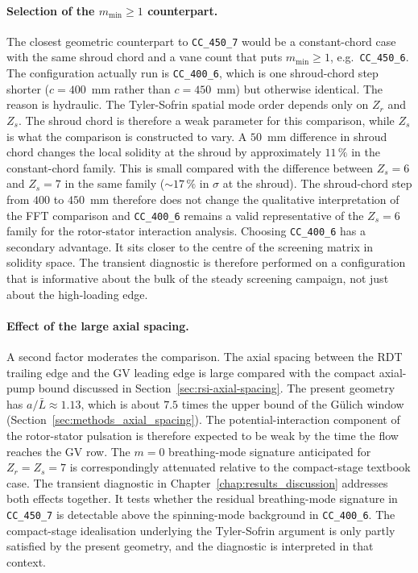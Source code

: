 \paragraph{Selection of the $m_{\min}\geq 1$ counterpart.}
The closest geometric counterpart to \texttt{CC\_450\_7} would be a constant-chord case with the same shroud chord and a vane count that puts $m_{\min}\geq 1$, e.g.\ \texttt{CC\_450\_6}. The configuration actually run is \texttt{CC\_400\_6}, which is one shroud-chord step shorter ($c=400$~mm rather than $c=450$~mm) but otherwise identical. The reason is hydraulic. The Tyler-Sofrin spatial mode order depends only on $Z_r$ and $Z_s$. The shroud chord is therefore a weak parameter for this comparison, while $Z_s$ is what the comparison is constructed to vary. A $50$~mm difference in shroud chord changes the local solidity at the shroud by approximately $11\,\%$ in the constant-chord family. This is small compared with the difference between $Z_s=6$ and $Z_s=7$ in the same family ($\sim 17\,\%$ in $\sigma$ at the shroud). The shroud-chord step from $400$ to $450$~mm therefore does not change the qualitative interpretation of the FFT comparison and \texttt{CC\_400\_6} remains a valid representative of the $Z_s=6$ family for the rotor-stator interaction analysis. Choosing \texttt{CC\_400\_6} has a secondary advantage. It sits closer to the centre of the screening matrix in solidity space. The transient diagnostic is therefore performed on a configuration that is informative about the bulk of the steady screening campaign, not just about the high-loading edge.

\paragraph{Effect of the large axial spacing.}
A second factor moderates the comparison. The axial spacing between the RDT trailing edge and the GV leading edge is large compared with the compact axial-pump bound discussed in Section~\ref{sec:rsi-axial-spacing}. The present geometry has $a/\bar{L} \approx 1.13$, which is about $7.5$ times the upper bound of the G\"ulich window (Section~\ref{sec:methods_axial_spacing}). The potential-interaction component of the rotor-stator pulsation is therefore expected to be weak by the time the flow reaches the GV row. The $m=0$ breathing-mode signature anticipated for $Z_r = Z_s = 7$ is correspondingly attenuated relative to the compact-stage textbook case. The transient diagnostic in Chapter~\ref{chap:results_discussion} addresses both effects together. It tests whether the residual breathing-mode signature in \texttt{CC\_450\_7} is detectable above the spinning-mode background in \texttt{CC\_400\_6}. The compact-stage idealisation underlying the Tyler-Sofrin argument is only partly satisfied by the present geometry, and the diagnostic is interpreted in that context.

